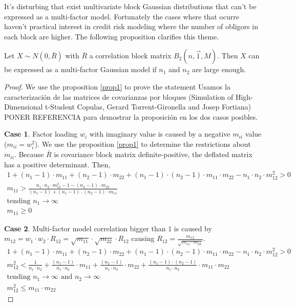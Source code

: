 \documentclass[11pt,fleqn]{book} %
\begin{document}
It's disturbing that exist multivariate block Gaussian distributions 
that can't be expressed as a multi-factor model. Fortunately the 
cases where that ocurre haven't practical interest in credit risk
modeling where the number of obligors in each block are higher. 
The following proposition clarifies this theme.

\begin{proposition}
\label{prop:gmfamgb}
Let $X \sim N(0,\bar{R})$ with $\bar{R}$ a correlation block matrix 
$B_2(n,\vec{1},M)$. Then $X$ can be expressed as a multi-factor 
Gaussian model if $n_1$ and $n_2$ are large enough.
\end{proposition}
\begin{proof}
We use the proposition \ref{prop1} to prove the statement Usamos la caracterización de las matrices de covarianzas por bloques (Simulation of High-Dimensional t-Student Copulas, Gerard Torrent-Gironella and Josep Fortiana) PONER REFERENCIA para demostrar la proposición en los dos casos posibles.

\textbf{Case 1}. Factor loading $w_i$ with imaginary value is caused by a negative 
$m_{ii}$ value ($m_{ii} = w_i^2$). We use the proposition \ref{prop1} to determine
the restrictions about $m_{ii}$. Because $\bar{R}$ is covariance block matrix 
definite-positive, the deflated matrix has a positive determinant. Then,
\begin{displaymath}
\begin{array}{l}
1 + (n_1-1) \cdot m_{11} + (n_2-1) \cdot m_{22} + 
(n_1-1) \cdot (n_2-1) \cdot m_{11} \cdot m_{22} -
n_1 \cdot n_2 \cdot m_{12}^2 > 0
\\
m_{11} > \frac{n_1 \cdot n_2 \cdot m_{12}^2 -1 -(n_2-1) \cdot m_{22}}
              {(n_1-1) + (n_1-1) \cdot (n_2-1) \cdot m_{11}}
\\
\text{tending } n_1 \to \infty
\\
m_{11} \ge 0
\end{array}
\end{displaymath}

\textbf{Case 2}. Multi-factor model correlation bigger than $1$ is caused
by $m_{12} = w_1 \cdot w_2 \cdot R_{12} = \sqrt{m_{11}} \cdot \sqrt{m_{22}} \cdot R_{12}$
causing $R_{12} = \frac{m_{12}}{\sqrt{m_{11} \cdot m_{22}}}$.
\begin{displaymath}
\begin{array}{l}
1 + (n_1-1) \cdot m_{11} + (n_2-1) \cdot m_{22} + 
(n_1-1) \cdot (n_2-1) \cdot m_{11} \cdot m_{22} -
n_1 \cdot n_2 \cdot m_{12}^2 > 0
\\
m_{12}^2 < 
\frac{1}{n_1 \cdot n_2} +
\frac{(n_1-1)}{n_1 \cdot n_2} \cdot m_{11} +
\frac{(n_2-1)}{n_1 \cdot n_2} \cdot m_{22} +
\frac{(n_1-1) \cdot (n_2-1)}{n_1 \cdot n_2} \cdot m_{11} \cdot m_{22}
\\
\text{tending } n_1 \to \infty \text{ and } n_2 \to \infty
\\
m_{12}^2 \le m_{11} \cdot m_{22}
\end{array}
\end{displaymath}
\end{proof}
\end{document}
